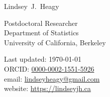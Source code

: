 \documentclass[a4paper, 11pt]{article}
\makeatletter
\newcommand{\firstname}{Lindsey}
\newcommand{\middleinitial}{J.}
\newcommand{\lastname}{Heagy}
\newcommand{\emailaddress}{lindseyheagy@gmail.com}
\newcommand{\email}{\href{mailto:\emailaddress}{\emailaddress}}
\newcommand{\websiteurl}{https://lindseyjh.ca}
\newcommand{\website}{\href{\websiteurl}{\websiteurl}}
\newcommand{\ORCIDNumber}{0000-0002-1551-5926}
\newcommand{\ORCID}{\href{https://orcid.org/\ORCIDNumber}{\ORCIDNumber}}
\newcommand{\position}{Postdoctoral Researcher}
\newcommand{\affiliation}{
    Department of Statistics \\
    University of California, Berkeley
}
\newcommand{\fullname}{\firstname\ \middleinitial\  \lastname}
\newcommand{\mytitle}[1]{
    {%
    \LARGE #1
    }\\[0.1cm]
}
\newcommand{\heading}[1]{
    \begin{minipage}[t]{\textwidth}
    \vspace{0.05cm}
    {\Large #1}\\
    \vspace{-0.35cm}
    \hrule
    \end{minipage}
    \vspace{0.1cm}
}
\makeatother
\begin{document}
\thispagestyle{empty}


\mytitle{\fullname}
\begin{minipage}[t]{0.595\textwidth}
    \position \\
    \affiliation
\end{minipage}
\begin{minipage}[t]{0.4\textwidth}
    \begin{flushright}
        Last updated: \monthyear\today
        \\
        ORCID: \ORCID
        \\
        email: \email
        \\
        website: \website
    \end{flushright}
\end{minipage}



\end{document}
